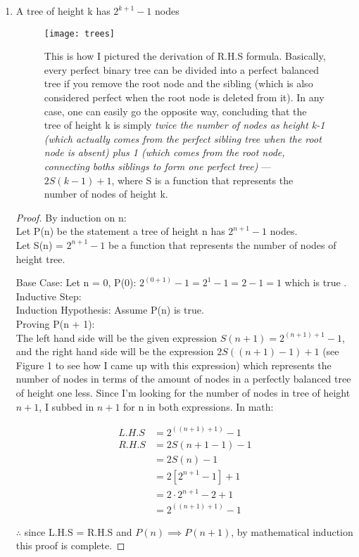 \documentclass[11pt]{article}
\begin{document}
\begin{enumerate}
\item { %
\begin{theorem} A tree of height k has $2^{k + 1} - 1$ nodes
\begin{figure}[h]
\caption{This is how I pictured the derivation of R.H.S formula. Basically, every perfect binary tree can be divided into a perfect balanced tree if you remove the root node and the sibling (which is also considered perfect when the root node is deleted from it). In any case, one can easily go the opposite way, concluding that the tree of height k is simply \emph{twice the number of nodes as height k-1 (which actually comes from the perfect sibling tree when the root node is absent) plus 1 (which comes from the root node, connecting boths siblings to form one perfect tree)} --- $2S(k - 1) + 1$, where S is a function that represents the number of nodes of height k.}
\centering
	\texttt{[image: trees]}
\end{figure}
\begin{proof}
By induction on n: \\

Let P(n) be the statement a tree of height n has $2^{n + 1} - 1$ nodes.\\
Let S(n) = $2^{n + 1} - 1$ be a function that represents the number of nodes of height tree.

Base Case: Let n = 0, P(0): $2^{(0 +1)} - 1 = 2^1 - 1 = 2 - 1 = 1$ which is true \checkmark.\\

Inductive Step:\\

Induction Hypothesis: Assume P(n) is true. \\

Proving P(n + 1):\\

The left hand side will be the given expression $S(n + 1) = 2^{(n + 1) + 1} - 1$, and the right hand side will be the expression $2S((n + 1) - 1) + 1$ (see Figure 1 to see how I came up with this expression) which represents the number of nodes in terms of the amount of nodes in a perfectly balanced tree of height one less. Since I'm looking for the number of nodes in tree of height $n + 1$, I subbed in $n + 1$ for n in both expressions. In math:

\begin{align*}
L.H.S & = 2^{((n + 1) + 1)} - 1 \\
R.H.S & = 2S(n + 1 - 1) - 1 \\
& = 2S(n) - 1 \\
& = 2[2^{n + 1} - 1] + 1 \\
& = 2\cdot 2^{n + 1} - 2 + 1 \\
& = 2^{((n + 1) + 1)} - 1
\end{align*} 

$\therefore$ since L.H.S = R.H.S and $P(n) \implies P(n + 1)$, by mathematical induction this proof is complete.
\end{proof}
\end{theorem}
}
\end{enumerate}
\end{document}
